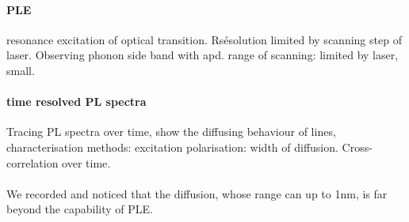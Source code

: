 \paragraph{PLE} resonance excitation of optical transition. Rsésolution limited by scanning step of laser. Observing phonon side band with apd. range of scanning: limited by laser, small.

\paragraph{time resolved PL spectra} Tracing PL spectra over time, show the diffusing behaviour of lines, characterisation methods: excitation polarisation: width of diffusion. Cross- correlation over time.
\paragraph{}We recorded and noticed that the diffusion, whose range can up to 1nm, is far beyond the capability of PLE. 